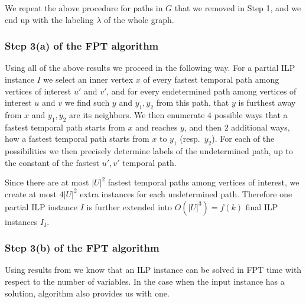 \documentclass[11pt,a4paper]{article}
\theoremstyle{remark}
\theoremstyle{definition}
\begin{document}
We repeat the above procedure for paths in $G$ that we removed in Step 1, and we end up with the labeling $\lambda$ of the whole graph.

\begin{comment}
Now we have to make sure that all the new labels satisfy $D$, to do this we calculate the matrix $D'$ of fastest temporal paths among all pairs of vertices in $(G, \lambda)$ and compare the results with $D$, if any values differ, we stop and return a \textsc{No} answer, if $D = D'$ we return the labeling $\lambda$.

To calculate $\lambda (s,v_i)$ we need $O(|N_{G'}(u)|) = O(n)$ time, therefore to calculate all labels of edges incident to vertices of degree one in $G$, we need $O(n^2)$ time, calculating $D'$ takes $O(n^3\log n)$ time (see \cref{lemma:calculatingD}), therefore the whole step is performed in polynomial time.
\end{comment}
%
%
\subsubsection*{Step 3(a) of the FPT algorithm}
Using all of the above results we proceed in the following way.
For a partial ILP instance $I$ we 
select an inner vertex $x$ of every fastest temporal path among vertices of interest $u'$ and $v'$,
and for every endetermined path among vertices of interest $u$ and $v$ we find such $y$ and $y_1, y_2$ from this path, that $y$ is furthest away from $x$ and $y_1, y_2$ are its neighbors.
We then enumerate $4$ possible ways that a fastest temporal path starts from $x$ and reaches $y$, 
and then $2$ additional ways, how a fastest temporal path starts from $x$ to $y_1$ (resp.~$y_2$).
For each of the possibilities we then precisely determine labels of the undetermined path, up to the constant of the fastest $u',v'$ temporal path.

Since there are at most $|U|^2$ fastest temporal paths among vertices of interest, we create at most $4|U|^2$ extra instances for each undetermined path.
Therefore one partial ILP instance $I$ is further extended into $O(|U|^3)=f(k)$  final ILP instances $I_I$.

\subsubsection*{Step 3(b) of the FPT algorithm}
Using results from \cite{Lenstra1983Integer} we know that an ILP instance can be solved in FPT time with respect to the number of variables. In the case when the input instance has a solution, algorithm also provides us with one.
\end{document}
